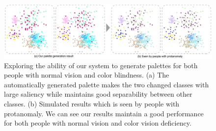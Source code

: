 \documentclass[review,onecolumn]{vgtc}                %
\begin{document}
\begin{figure}[ht]
\centering
\includegraphics[width=0.96\linewidth]{blindness.pdf}
\caption{Exploring the ability of our system to generate palettes for both people with normal vision and color blindness. (a) The automatically generated palette makes the two changed classes with large saliency while maintains good separability between other classes. (b) Simulated results which is seen by people with protanomaly. We can see our results maintain a good performance for both people with normal vision and color vision deficiency.}
\vspace*{-3mm}
\label{fig:blindness}
\end{figure}



\end{document}
